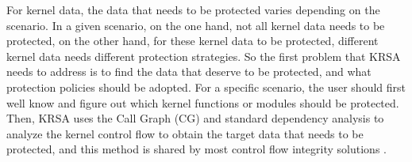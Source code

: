\documentclass[conference]{IEEEtran}
\begin{document}
For kernel data, the data that needs to be protected varies depending on the scenario. In a given scenario, on the one hand, not all kernel data needs to be protected, on the other hand, for these kernel data to be protected, different kernel data needs different protection strategies. So the first problem that KRSA needs to address is to find the data that deserve to be protected, and what protection policies should be adopted. For a specific scenario, the user should first well know and figure out which kernel functions or modules should be protected. Then, KRSA uses the Call Graph (CG) and standard dependency analysis to analyze the kernel control flow to obtain the target data that needs to be protected, and this method is shared by most control flow integrity solutions \cite{cfisurvey}. 
\end{document}
